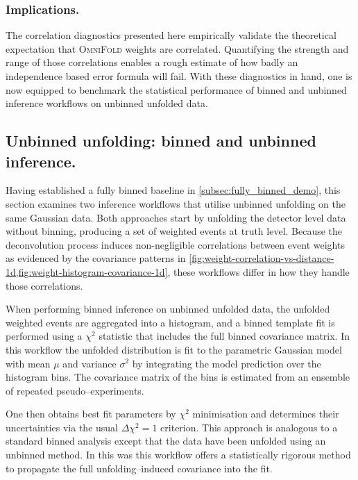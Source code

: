         \subsubsection{Implications.}
            The correlation diagnostics presented here {empirically validate} the theoretical expectation that \textsc{OmniFold} weights are correlated.
            Quantifying the strength and range of those correlations enables a rough estimate of how badly an independence based error formula will fail.
            With these diagnostics in hand, one is now equipped to benchmark the statistical performance of binned and unbinned inference workflows on unbinned unfolded data.
    \subsection{Unbinned unfolding: binned and unbinned inference.}
    \label{subsec:unbinned_data}
        Having established a fully binned baseline in \cref{subsec:fully_binned_demo}, this section examines two inference workflows that utilise unbinned unfolding on the same Gaussian data.
        Both approaches start by unfolding the detector level data without binning, producing a set of weighted events at truth level.
        Because the deconvolution process induces non-negligible correlations between event weights as evidenced by the covariance patterns in \cref{fig:weight-correlation-vs-distance-1d,fig:weight-histogram-covariance-1d}, these workflows differ in how they handle those correlations.
    
        When performing binned inference on unbinned unfolded data, the unfolded weighted events are aggregated into a histogram, and a binned template fit is performed using a $\chi^2$ statistic that includes the full binned covariance matrix.
        In this workflow the unfolded distribution is fit to the parametric Gaussian model with mean $\mu$ and variance $\sigma^2$ by integrating the model prediction over the histogram bins.
        The covariance matrix of the bins is estimated from an ensemble of repeated pseudo--experiments.
        
        One then obtains best fit parameters by $\chi^2$ minimisation and determines their uncertainties via the usual $\Delta\chi^2=1$ criterion.
        This approach is analogous to a standard binned analysis except that the data have been unfolded using an unbinned method.
        In this was this workflow offers a statistically rigorous method to propagate the full unfolding--induced covariance into the fit.
    
